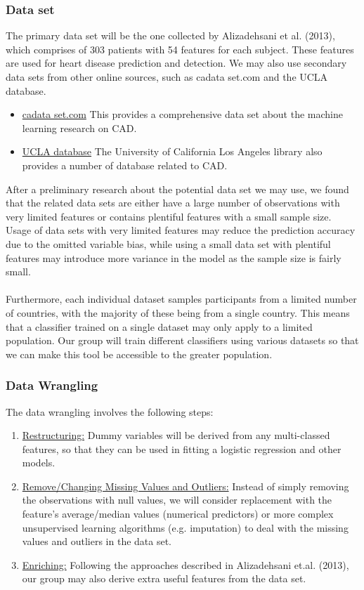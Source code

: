 \documentclass[a4paper, 12pt]{article}
\begin{document}
\subsubsection{Data set}
The primary data set will be the one collected by Alizadehsani et al. (2013), which comprises of 303 patients with 54 features for each subject. These features are used for heart disease prediction and detection. We may also use secondary data sets from other online sources, such as cadata set.com and the UCLA database.
\begin{itemize}
    \item \underline{cadata set.com} This provides a comprehensive data set about the machine learning research on CAD.
    \item \underline{UCLA database} The University of California Los Angeles library also provides a number of database related to CAD. 
\end{itemize}
After a preliminary research about the potential data set we may use, we found that the related data sets are either have a large number of observations with very limited features or contains plentiful features with a small sample size. Usage of data sets with very limited features may reduce the prediction accuracy due to the omitted variable bias, while using a small data set with plentiful features may introduce more variance in the model as the sample size is fairly small.\\\\
Furthermore, each individual dataset samples participants from a limited number of countries, with the majority of these being from a single country. This means that a classifier trained on a single dataset may only apply to a limited population. Our group will train different classifiers using various datasets so that we can make this tool be accessible to the greater population. 

\subsubsection{Data Wrangling}
The data wrangling involves the following steps:
\begin{enumerate}
    \item \underline{Restructuring:} Dummy variables will be derived from any multi-classed features, so that they can be used in fitting a logistic regression and other models.
    \item \underline{Remove/Changing Missing Values and Outliers:} Instead of simply removing the observations with null values, we will consider replacement with the feature's average/median values (numerical predictors) or more complex unsupervised learning algorithms (e.g. imputation) to deal with the missing values and outliers in the data set. 
    \item \underline{Enriching:} Following the approaches described in Alizadehsani et.al. (2013), our group may also derive extra useful features from the data set. 
\end{enumerate}
\end{document}
